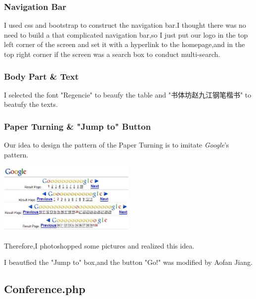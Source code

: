 \documentclass[10pt,twoside,a4paper,titlepage]{article}
\begin{document}
	
	\subsubsection{Navigation Bar}
	
	I used css and bootstrap to construct the navigation bar.I thought there was no need to build a  that complicated navigation bar,so I just put our logo in the top left corner of the screen and set it with a hyperlink to the homepage,and in the top right corner if the screen was a search box to conduct multi-search.
	
	\subsubsection{Body Part \& Text}
	
	I selected the font "Regencie" to beaufy the table and "书体坊赵九江钢笔楷书" to beatufy the texts.
	
	\subsubsection{Paper Turning \& "Jump to" Button }
	
	Our idea to design the pattern of the Paper Turning is to imitate \emph{Google}'s pattern.
	
	\includegraphics[width=0.5\textwidth]{cyf/Google.jpg}
	
	Therefore,I photoshopped some pictures and realized this idea.
	
	I beautfied the "Jump to" box,and the button "Go!" was modified by Aofan Jiang.
	
	
	\subsection{Conference.php}
	
	
	
	
	
		
	
	
	
	
	
	
		
	
	 
\end{document}
